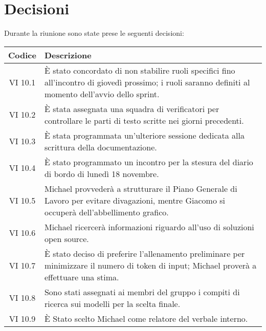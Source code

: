 
\section{Decisioni}

Durante la riunione sono state prese le seguenti decisioni:

\vspace{0.5cm}

\begin{table}[htbp]
    \centering
    \begin{tabular}{|c|p{}|}
        \hline
        \rowcolor[gray]{0.75}
        \textbf{Codice} & \textbf{Descrizione}\\
        \hline
        VI 10.1 & È stato concordato di non stabilire ruoli specifici fino all'incontro di giovedì prossimo; i ruoli saranno definiti al momento dell'avvio dello sprint.\\
        \hline
        VI 10.2 & È stata assegnata una squadra di verificatori per controllare le parti di testo scritte nei giorni precedenti.\\
        \hline
        VI 10.3 & È stata programmata un'ulteriore sessione dedicata alla scrittura della documentazione.\\
        \hline
        VI 10.4 & È stato programmato un incontro per la stesura del diario di bordo di lunedì 18 novembre.\\
        \hline
        VI 10.5 & Michael provvederà a strutturare il Piano Generale di Lavoro per evitare divagazioni, mentre Giacomo si occuperà dell'abbellimento grafico.\\
        \hline
        VI 10.6 & Michael ricercerà informazioni riguardo all'uso di soluzioni open source.\\
        \hline
        VI 10.7 & È stato deciso di preferire l'allenamento preliminare per minimizzare il numero di token di input; Michael proverà a effettuare una stima.\\
        \hline
        VI 10.8 & Sono stati assegnati ai membri del gruppo i compiti di ricerca sui modelli per la scelta finale.\\
        \hline
        VI 10.9 & È Stato scelto Michael come relatore del verbale interno.\\
        \hline
    \end{tabular}
\end{table}